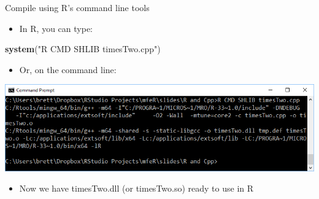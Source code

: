 \documentclass[ignorenonframetext,]{beamer}
\newenvironment{Shaded}{\begin{snugshade}}{\end{snugshade}}
\newcommand{\KeywordTok}[1]{\textcolor[rgb]{0.13,0.29,0.53}{\textbf{{#1}}}}
\newcommand{\StringTok}[1]{\textcolor[rgb]{0.31,0.60,0.02}{{#1}}}
\newcommand{\NormalTok}[1]{{#1}}
\providecommand{\tightlist}{%
\setlength{\itemsep}{0pt}\setlength{\parskip}{0pt}}
\begin{document}
\begin{frame}[fragile]{Compile using R's command line tools}

\begin{itemize}
\tightlist
\item
  In R, you can type:
\end{itemize}

\begin{Shaded}
\begin{Highlighting}[]
\KeywordTok{system}\NormalTok{(}\StringTok{"R CMD SHLIB timesTwo.cpp"}\NormalTok{)}
\end{Highlighting}
\end{Shaded}

\begin{itemize}
\tightlist
\item
  Or, on the command line:
\end{itemize}

\centerline{
  \includegraphics[width=\textwidth,height=0.4\textheight,keepaspectratio]{./RcmdSHLIB}
}

\begin{itemize}
\tightlist
\item
  Now we have timesTwo.dll (or timesTwo.so) ready to use in R
\end{itemize}

\end{frame}
\end{document}
